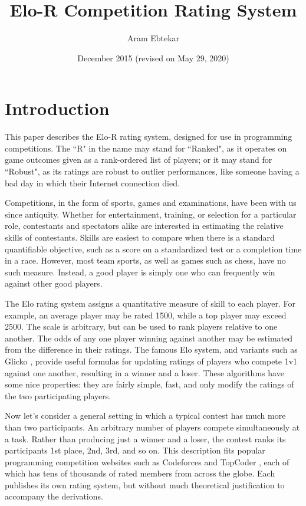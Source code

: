 \documentclass{article}
\title{Elo-R Competition Rating System}
\author{Aram Ebtekar}
\date{December 2015 (revised on May 29, 2020)}
\begin{document}
\maketitle

\section{Introduction}

This paper describes the Elo-R rating system, designed for use in programming competitions. The ``R" in the name may stand for ``Ranked", as it operates on game outcomes given as a rank-ordered list of players; or it may stand for ``Robust", as its ratings are robust to outlier performances, like someone having a bad day in which their Internet connection died.

Competitions, in the form of sports, games and examinations, have been with us since antiquity. Whether for entertainment, training, or selection for a particular role, contestants and spectators alike are interested in estimating the relative skills of contestants. Skills are easiest to compare when there is a standard quantifiable objective, such as a score on a standardized test or a completion time in a race.  However, most team sports, as well as games such as chess, have no such measure. Instead, a good player is simply one who can frequently win against other good players.

The Elo rating system assigns a quantitative measure of skill to each player. For example, an average player may be rated 1500, while a top player may exceed 2500. The scale is arbitrary, but can be used to rank players relative to one another. The odds of any one player winning against another may be estimated from the difference in their ratings. The famous Elo system, and variants such as Glicko \cite{glicko}, provide useful formulas for updating ratings of players who compete 1v1 against one another, resulting in a winner and a loser. These algorithms have some nice properties: they are fairly simple, fast, and only modify the ratings of the two participating players.

Now let's consider a general setting in which a typical contest has much more than two participants. An arbitrary number of players compete simultaneously at a task. Rather than producing just a winner and a loser, the contest ranks its participants 1st place, 2nd, 3rd, and so on. This description fits popular programming competition websites such as Codeforces \cite{Codeforces} and TopCoder \cite{TopCoder}, each of which has tens of thousands of rated members from across the globe. Each publishes its own rating system, but without much theoretical justification to accompany the derivations.
\end{document}
